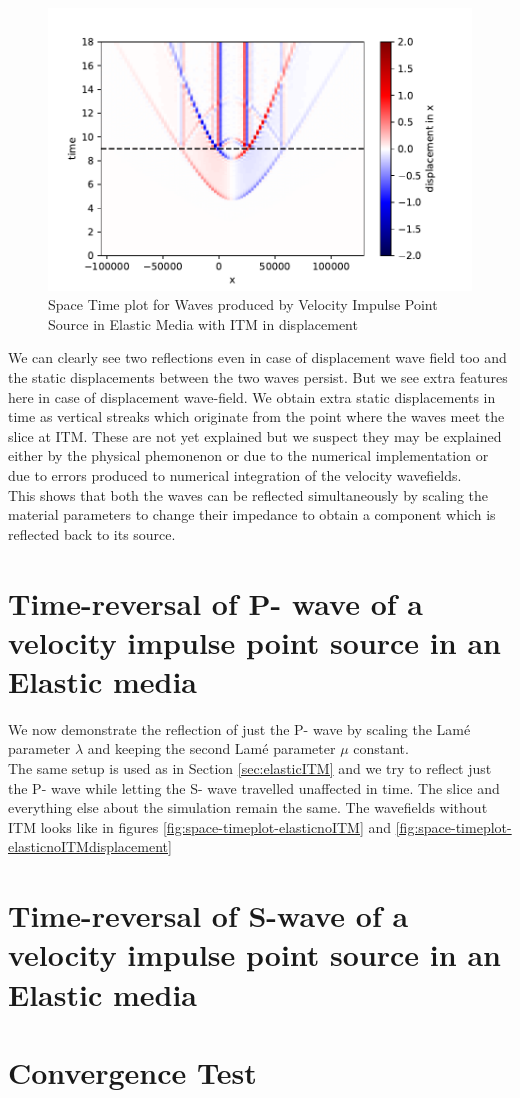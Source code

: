 \begin{figure}
    \centering
    \includegraphics[width=0.75\linewidth]{figures/Elastic-tworeflections-displacement.pdf}
    \caption{Space Time plot for Waves produced by Velocity Impulse Point Source in Elastic Media with \ac{ITM} in displacement}
    \label{fig:space-timeplot-elasticITMdisplacement}
\end{figure}

We can clearly see two reflections even in case of displacement wave field too and the static displacements between the two waves persist. But we see extra features
here in case of displacement wave-field. We obtain extra static displacements in time as vertical streaks which originate from the point where the waves meet the slice
at \ac{ITM}. These are not yet explained but we suspect they may be explained either by the physical phemonenon or due to the numerical implementation or due to errors
produced to numerical integration of the velocity wavefields. \\

This shows that both the waves can be reflected simultaneously by scaling the material parameters to change their impedance to obtain a component which 
is reflected back to its source. \\

\section{Time-reversal of P- wave of a velocity impulse point source in an Elastic media}
We now demonstrate the reflection of just the P- wave by scaling the Lam\'{e} parameter $\lambda$ and keeping the second Lam\'{e} parameter $\mu$ constant.\\
The same setup is used as in Section \ref{sec:elasticITM} and we try to reflect just the P- wave while letting the S- wave travelled unaffected in time. The slice
and everything else about the simulation remain the same. The wavefields without \ac{ITM} looks like in figures \ref{fig:space-timeplot-elasticnoITM} and
\ref{fig:space-timeplot-elasticnoITMdisplacement}

\section{Time-reversal of S-wave of a velocity impulse point source in an Elastic media}

\section{Convergence Test}

